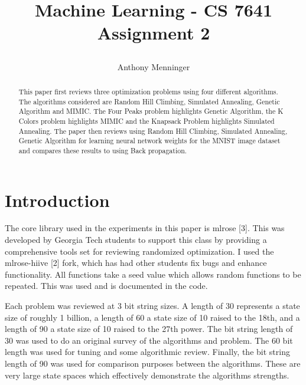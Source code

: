 \documentclass[letterpaper]{article} %
\title{
Machine Learning - CS 7641
Assignment 2
	
}
\author {
    Anthony Menninger \\
}
\begin{document}
\maketitle

\begin{abstract}
This paper first reviews three optimization problems using four different algorithms. The algorithms considered are Random Hill Climbing, Simulated Annealing, Genetic Algorithm and MIMIC.  The Four Peaks problem highlights Genetic Algorithm, the K Colors problem highlights MIMIC and the Knapsack Problem highlights Simulated Annealing.  The paper then reviews using Random Hill Climbing, Simulated Annealing, Genetic Algorithm for learning neural network weights for the MNIST image dataset and compares these results to using Back propagation.  
\end{abstract}

\section{Introduction}
The core library used in the experiments in this paper is mlrose [3].  This was developed by Georgia Tech students to support this class by providing a comprehensive tools set for reviewing randomized optimization.  I used the mlrose-hiive [2] fork, which has had other students fix bugs and enhance functionality.  All functions take a seed value which allows random functions to be repeated.  This was used and is documented in the code.

Each problem was reviewed at 3 bit string sizes.   A length of 30 represents a state size of roughly 1 billion, a length of 60 a state size of 10 raised to the 18th, and a length of 90 a state size of 10 raised to the 27th power.  The bit string length of 30 was used to do an original survey of the algorithms and problem.  The 60 bit length was used for tuning and some algorithmic review.  Finally, the bit string length of 90 was used for comparison purposes between the algorithms.  These are very large state spaces which effectively demonstrate the algorithms strengths. 
\end{document}
